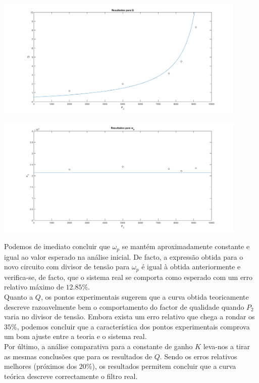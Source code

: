 \documentclass[a4paper,11pt]{report}
\begin{document}
\begin{center}
     \includegraphics[angle=0,width=0.9\textwidth]{RelacaoQP2KHN.png}
     \label{fig:RelacaoQP2KHN}
     \end{center}

\begin{center}
     \includegraphics[angle=0,width=0.9\textwidth]{RelacaowpP2KHN.png}
     \label{fig:RelacaowpP2KHN}
     \end{center}

Podemos de imediato concluir que $\omega_p$ se mantém aproximadamente constante e igual ao valor esperado na análise inicial. De facto, a expressão obtida para o novo circuito com divisor de tensão para $\omega_p$ é igual à obtida anteriormente e verifica-se, de facto, que o sistema real se comporta como esperado com um erro relativo máximo de $12.85\%$.\\
Quanto a $Q$, os pontos experimentais sugerem que a curva obtida teoricamente descreve razoavelmente bem o comportamento do factor de qualidade quando $P_2$ varia no divisor de tensão. Embora exista um erro relativo que chega a rondar os $35\%$, podemos concluir que a característica dos pontos experimentais comprova um bom ajuste entre a teoria e o sistema real.\\
Por último, a análise comparativa para a constante de ganho $K$ leva-nos a tirar as mesmas conclusões que para os resultados de $Q$. Sendo os erros relativos melhores (próximos dos $20\%$), os resultados permitem concluir que a curva teórica descreve correctamente o filtro real. 
\end{document}
